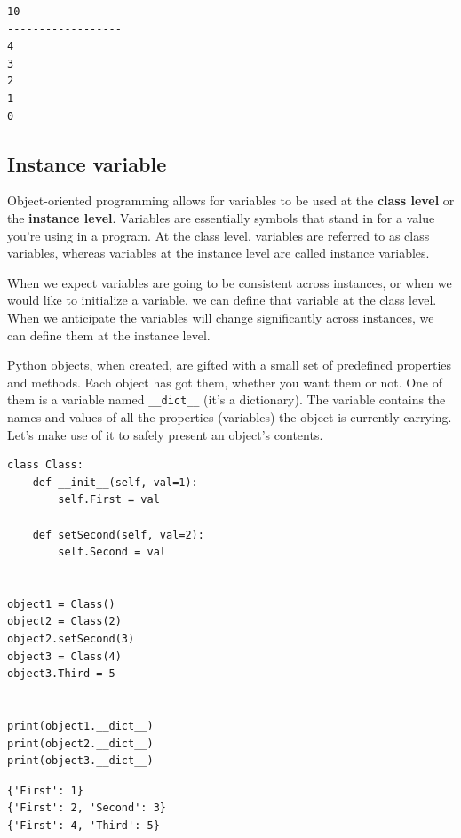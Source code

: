\documentclass[11pt]{article}
\begin{document}
\begin{verbatim}
10
------------------
4
3
2
1
0
\end{verbatim}

\subsection{Instance variable}
\label{sec:orgd02989e}
Object-oriented programming allows for variables to be used at the
\textbf{class level} or the \textbf{instance level}. Variables are essentially
symbols that stand in for a value you’re using in a program. At the
class level, variables are referred to as class variables, whereas
variables at the instance level are called instance variables.

When we expect variables are going to be consistent across instances,
or when we would like to initialize a variable, we can define that
variable at the class level. When we anticipate the variables will
change significantly across instances, we can define them at the
instance level.

Python objects, when created, are gifted with a small set of
predefined properties and methods. Each object has got them, whether
you want them or not. One of them is a variable named \texttt{\_\_dict\_\_} (it’s a
dictionary).  The variable contains the names and values of all the
properties (variables) the object is currently carrying. Let’s make
use of it to safely present an object’s contents.

\begin{verbatim}
class Class:
	def __init__(self, val=1):
		self.First = val

	def setSecond(self, val=2):
		self.Second = val


object1 = Class()
object2 = Class(2)
object2.setSecond(3)
object3 = Class(4)
object3.Third = 5


print(object1.__dict__)
print(object2.__dict__)
print(object3.__dict__)
\end{verbatim}

\begin{verbatim}
{'First': 1}
{'First': 2, 'Second': 3}
{'First': 4, 'Third': 5}
\end{verbatim}
\end{document}

